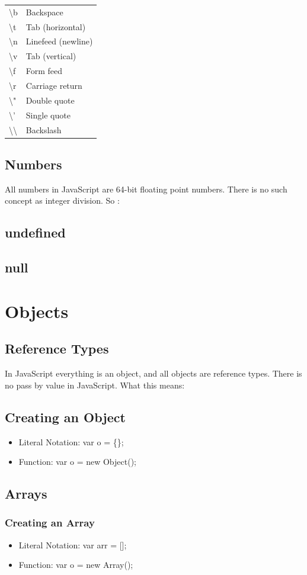 \documentclass {article}
\begin{document}
			\begin{center}
			\begin{tabular} {| l |p{5cm}|}
			
				\textbackslash{b} & Backspace \\
				\textbackslash{t} & Tab (horizontal) \\
				\textbackslash{n} & Linefeed (newline) \\
				\textbackslash{v} & Tab (vertical) \\
				\textbackslash{f} & Form feed  \\
				\textbackslash{r} & Carriage return        \\
				\textbackslash{"} & Double quote           \\
				\textbackslash{'} & Single quote           \\
				\textbackslash{}\textbackslash{} & Backslash              \\

			\end{tabular}
			\end{center}
\subsection{Numbers}
	All numbers in JavaScript are 64-bit floating point numbers.  There is no such concept as integer division.  So : 
\subsection {undefined}
\subsection {null}


\section{Objects}
	\subsection {Reference Types}
		In JavaScript everything is an object, and all objects are reference types.  There is no pass by value in JavaScript.  
		What this means: 
	
	\subsection{Creating an Object}
		\begin{itemize}
			\item Literal Notation: var o = \{\};
			\item Function: var o = new Object();
		\end{itemize}		

	\subsection{Arrays}
		\subsubsection {Creating an Array}
			\begin{itemize}
				\item Literal Notation: var arr = [];
				\item Function: var o = new Array();
			\end{itemize}
	
	

			
\end{document}
